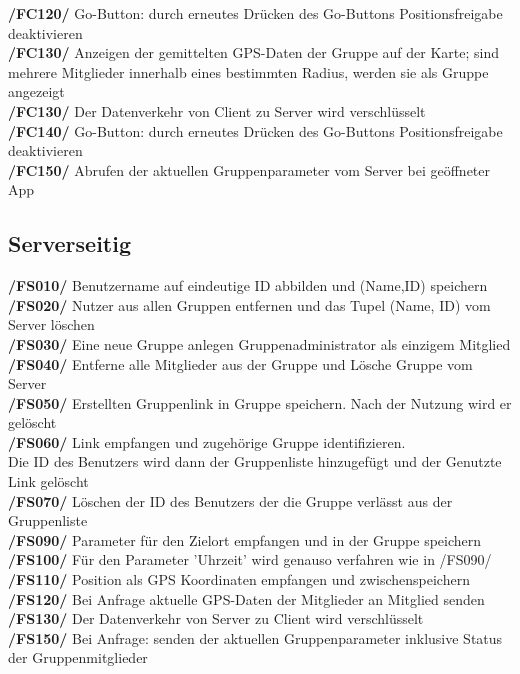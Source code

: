      \textbf{/FC120/} Go-Button: durch erneutes Drücken des Go-Buttons Positionsfreigabe deaktivieren\\
     \textbf{/FC130/} Anzeigen der gemittelten GPS-Daten der Gruppe auf der Karte; sind mehrere Mitglieder innerhalb eines bestimmten Radius,
     werden sie als Gruppe angezeigt\\
     \textbf{/FC130/} Der Datenverkehr von Client zu Server wird verschlüsselt\\
     \textbf{/FC140/} Go-Button: durch erneutes Drücken des Go-Buttons Positionsfreigabe deaktivieren\\
     \textbf{/FC150/} Abrufen der aktuellen Gruppenparameter vom Server bei geöffneter App\\
\subsection{Serverseitig}
     \textbf{/FS010/} Benutzername auf eindeutige ID abbilden und (Name,ID) speichern\\
     \textbf{/FS020/} Nutzer aus allen Gruppen entfernen und das Tupel (Name, ID) vom Server löschen \\
     \textbf{/FS030/} Eine neue Gruppe anlegen Gruppenadministrator als einzigem Mitglied\\
     \textbf{/FS040/} Entferne alle Mitglieder aus der Gruppe und Lösche Gruppe vom Server\\
     \textbf{/FS050/} Erstellten Gruppenlink in Gruppe speichern. Nach der Nutzung wird er gelöscht\\
     \textbf{/FS060/} Link empfangen und zugehörige Gruppe identifizieren.\\ Die ID des Benutzers wird dann der Gruppenliste hinzugefügt und der Genutzte Link gelöscht\\
     \textbf{/FS070/} Löschen der ID des Benutzers der die Gruppe verlässt aus der Gruppenliste\\
     \textbf{/FS090/} Parameter für den Zielort empfangen und in der Gruppe speichern\\
     \textbf{/FS100/} Für den Parameter 'Uhrzeit' wird genauso verfahren wie in /FS090/ \\
     \textbf{/FS110/} Position als GPS Koordinaten empfangen und zwischenspeichern\\
     \textbf{/FS120/} Bei Anfrage aktuelle GPS-Daten der Mitglieder an Mitglied senden \\
     \textbf{/FS130/} Der Datenverkehr von Server zu Client wird verschlüsselt\\
     \textbf{/FS150/} Bei Anfrage: senden der aktuellen Gruppenparameter inklusive Status der Gruppenmitglieder\\
